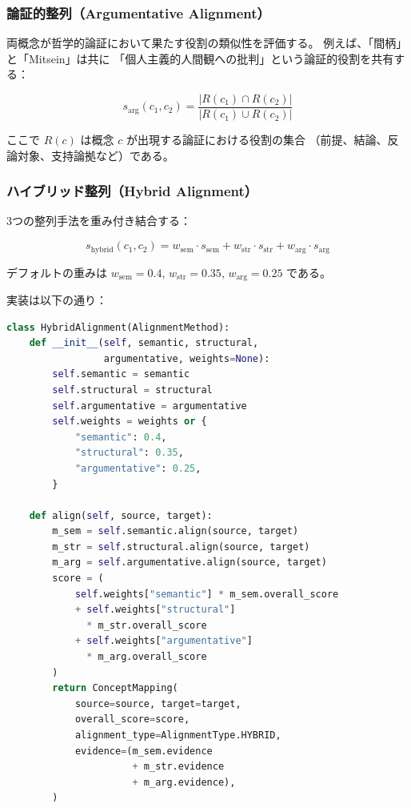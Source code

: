 \documentclass[a4paper,11pt]{ltjsarticle}
\begin{document}
\subsubsection{論証的整列（Argumentative Alignment）}

両概念が哲学的論証において果たす役割の類似性を評価する。
例えば、「間柄」と「Mitsein」は共に
「個人主義的人間観への批判」という論証的役割を共有する：

\begin{equation}\label{eq:argumentative}
  s_{\text{arg}}(c_1, c_2) = \frac{|R(c_1) \cap R(c_2)|}{|R(c_1) \cup R(c_2)|}
\end{equation}

ここで $R(c)$ は概念 $c$ が出現する論証における役割の集合
（前提、結論、反論対象、支持論拠など）である。

\subsubsection{ハイブリッド整列（Hybrid Alignment）}

3つの整列手法を重み付き結合する：

\begin{equation}\label{eq:hybrid}
  s_{\text{hybrid}}(c_1, c_2) = w_{\text{sem}} \cdot s_{\text{sem}} + w_{\text{str}} \cdot s_{\text{str}} + w_{\text{arg}} \cdot s_{\text{arg}}
\end{equation}

デフォルトの重みは $w_{\text{sem}} = 0.4$, $w_{\text{str}} = 0.35$,
$w_{\text{arg}} = 0.25$ である。

実装は以下の通り：

\begin{lstlisting}[language=Python,caption=HybridAlignment の実装]
class HybridAlignment(AlignmentMethod):
    def __init__(self, semantic, structural,
                 argumentative, weights=None):
        self.semantic = semantic
        self.structural = structural
        self.argumentative = argumentative
        self.weights = weights or {
            "semantic": 0.4,
            "structural": 0.35,
            "argumentative": 0.25,
        }

    def align(self, source, target):
        m_sem = self.semantic.align(source, target)
        m_str = self.structural.align(source, target)
        m_arg = self.argumentative.align(source, target)
        score = (
            self.weights["semantic"] * m_sem.overall_score
            + self.weights["structural"]
              * m_str.overall_score
            + self.weights["argumentative"]
              * m_arg.overall_score
        )
        return ConceptMapping(
            source=source, target=target,
            overall_score=score,
            alignment_type=AlignmentType.HYBRID,
            evidence=(m_sem.evidence
                      + m_str.evidence
                      + m_arg.evidence),
        )
\end{lstlisting}
\end{document}
